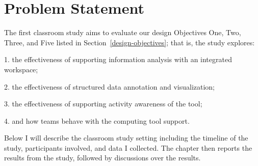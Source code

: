 \section{Problem Statement}

The first classroom study aims to evaluate our design Objectives One, Two, Three, and Five listed in Section~\ref{design-objectives}; that is, the study explores:

1. the effectiveness of supporting information analysis with an integrated workspace;

2. the effectiveness of structured data annotation and visualization;

3. the effectiveness of supporting activity awareness of the tool;

4. and how teams behave with the computing tool support.

Below I will describe the classroom study setting including the timeline of the study, participants involved, and data I collected. The chapter then reports the results from the study, followed by discussions over the results.